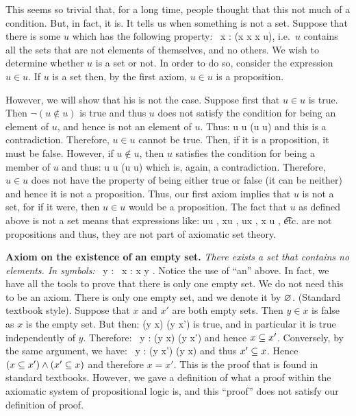 This seems so trivial that, for a long time, people thought that this not much of a condition.
But, in fact, it is.
It tells us when something is not a set.
Suppose that there is some $u$ which has the following property:
\bse
\forall \, x : (x \notin x \eqv x \in u),
\ese
i.e.\ $u$ contains all the sets that are not elements of themselves, and no others.
We wish to determine whether $u$ is a set or not.
In order to do so, consider the expression $u\in u$.
If $u$ is a set then, by the first axiom, $u\in u$ is a proposition.

However, we will show that his is not the case.
Suppose first that $u\in u$ is true.
Then $\neg(u\notin u)$ is true and thus $u$ does not satisfy the condition for being an element of $u$, and hence is not an element of $u$.
Thus:
\bse
u \in u \imp \neg(u \in u)
\ese
and this is a contradiction.
Therefore, $u\in u$ cannot be true.
Then, if it is a proposition, it must be false.
However, if $u \notin u$, then $u$ satisfies the condition for being a member of $u$ and thus:
\bse
u \notin u \imp \neg(u \notin u)
\ese
which is, again, a contradiction.
Therefore, $u\in u$ does not have the property of being either true or false (it can be neither) and hence it is not a proposition.
Thus, our first axiom implies that $u$ is not a set, for if it were, then $u\in u$ would be a proposition.
\ee
\br
The fact that $u$ as defined above is not a set means that expressions like:
\bse
u\in u , \quad x\in u , \quad u\in x , \quad x \notin u , \quad \t{etc.}
\ese
are not propositions and thus, they are not part of axiomatic set theory.
\er

\textbf{Axiom on the existence of an empty set.} \emph{There exists a set that contains no elements.
In symbols:}
\bse
\exists \, y : \forall \, x : x \notin y .
\ese
Notice the use of ``an'' above.
In fact, we have all the tools to prove that there is only one empty set.
We do not need this to be an axiom.
\bt
There is only one empty set, and we denote it by $\varnothing$.
\et
\bq(Standard textbook style).
Suppose that $x$ and $x'$ are both empty sets.
Then $y\in x$ is false as $x$ is the empty set.
But then:
\bse
 (y \in x) \imp (y \in x')
\ese
is true, and in particular it is true independently of $y$.
Therefore:
\bse
\forall \, y : (y \in x) \imp (y \in x')
\ese
and hence $x \subseteq x'$.
Conversely, by the same argument, we have:
\bse
\forall \, y : (y \in x') \imp (y \in x)
\ese
and thus $x' \subseteq x$.
Hence $(x \subseteq x') \land (x' \subseteq x)$ and therefore $x = x'$.
\eq
This is the proof that is found in standard textbooks.
However, we gave a definition of what a proof within the axiomatic system of propositional logic is, and this ``proof'' does not satisfy our definition of proof.

